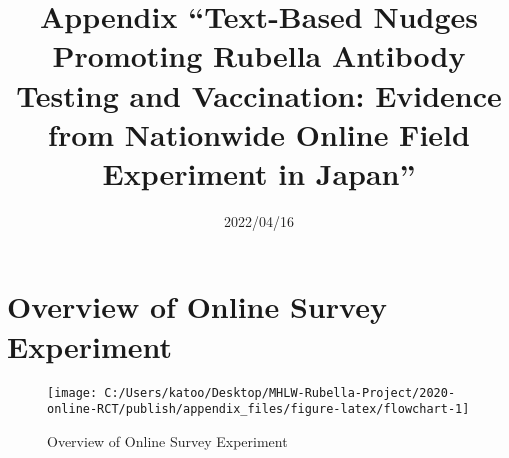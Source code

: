 \documentclass[
  11pt,
  a4paper,
]{article}
\title{Appendix
``Text-Based Nudges Promoting Rubella Antibody Testing and Vaccination:
Evidence from Nationwide Online Field Experiment in Japan''  }
\date{2022/04/16}
\begin{document}
\begin{spacing}{1}
  \maketitle
\end{spacing}

{
\setcounter{tocdepth}{2}
\tableofcontents
}
\hypertarget{appendix-appendix}{%
\appendix}


\hypertarget{overview-of-online-survey-experiment}{%
\section{Overview of Online Survey Experiment}\label{overview-of-online-survey-experiment}}

\begin{figure}[t]
\texttt{[image: C:/Users/katoo/Desktop/MHLW-Rubella-Project/2020-online-RCT/publish/appendix\_files/figure-latex/flowchart-1]} \caption{Overview of Online Survey Experiment}\label{fig:flowchart}
\end{figure}
\end{document}
